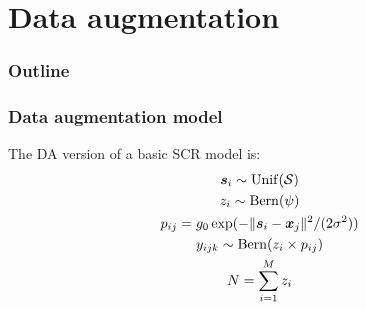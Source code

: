 \documentclass[color=usenames,dvipsnames]{beamer}\usepackage[]{graphicx}\usepackage[]{color}
\begin{document}
\section{Data augmentation}




\begin{frame}
  \frametitle{Outline}
  \Large
  \tableofcontents[currentsection]
\end{frame}





\begin{frame}
  \frametitle{Data augmentation model}
  The DA version of a basic SCR model is:
  \begin{gather*}
    {\bm s}_i \sim \mathrm{Unif}(\mathcal{S}) \\
    z_i \sim \mathrm{Bern}(\psi) \\
    p_{ij} = g_0\exp(-\|{\bm s}_i-{\bm x}_j\|^2/(2\sigma^2)) \\
    y_{ijk} \sim \mathrm{Bern}(z_i \times p_{ij}) \\
    N=\sum_{i=1}^M z_i
  \end{gather*}
\end{frame}
\end{document}
